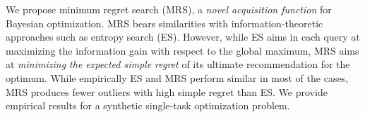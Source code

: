 

\begin{block}{}
\justifying
We propose minimum regret search (MRS), a \emph{novel acquisition function} for Bayesian
optimization. MRS bears similarities with information-theoretic approaches
such as entropy search (ES). However, while ES aims in each query at maximizing the
information gain with respect to the global maximum, MRS aims at \emph{minimizing the
expected simple regret} of its ultimate recommendation for the optimum. While empirically ES and MRS perform similar in most of the
cases, MRS produces fewer outliers with high simple regret than ES. We provide empirical
results for a synthetic single-task optimization problem.
\end{block}

